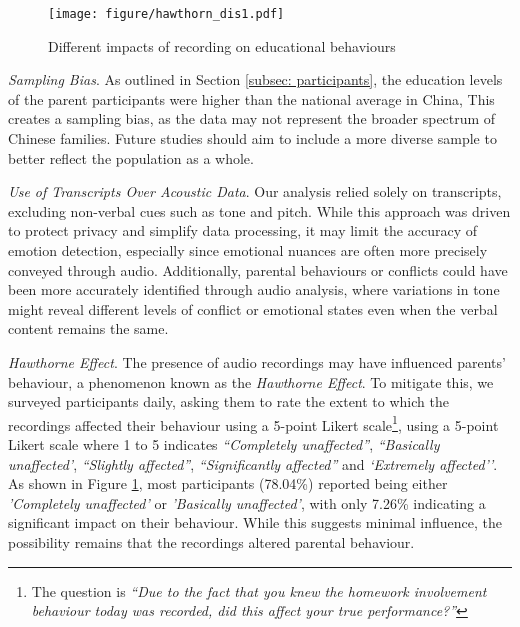\begin{figure}
    \centering
    \texttt{[image: figure/hawthorn\_dis1.pdf]}
    \caption{Different impacts of recording on educational behaviours}
    \label{fig:hawthorn}
\end{figure}


\textit{Sampling Bias}. As outlined in Section \ref{subsec: participants}, the education levels of the parent participants were higher than the national average in China, 
This creates a sampling bias, as the data may not represent the broader spectrum of Chinese families. Future studies should aim to include a more diverse sample to better reflect the population as a whole.

\textit{Use of Transcripts Over Acoustic Data}. Our analysis relied solely on transcripts, excluding non-verbal cues such as tone and pitch. While this approach was driven to protect privacy and simplify data processing, it may limit the accuracy of emotion detection, especially since emotional nuances are often more precisely conveyed through audio. Additionally, parental behaviours or conflicts could have been more accurately identified through audio analysis, where variations in tone might reveal different levels of conflict or emotional states even when the verbal content remains the same.





\textit{Hawthorne Effect}. The presence of audio recordings may have influenced parents' behaviour, a phenomenon known as the \textit{Hawthorne Effect}. To mitigate this, we surveyed participants daily, asking them to rate the extent to which the recordings affected their behaviour using a 5-point Likert scale\footnote{The question is \textit{``Due to the fact that you knew the homework involvement behaviour today was recorded, did this affect your true performance?''}}, using a 5-point Likert scale where 1 to 5 indicates \textit{``Completely unaffected''}, \textit{``Basically unaffected'}, \textit{``Slightly affected''}, \textit{``Significantly affected''} and \textit{`Extremely affected''}. As shown in Figure \ref{fig:hawthorn}, most participants (78.04\%) reported being either \textit{'Completely unaffected'} or \textit{'Basically unaffected'}, with only 7.26\% indicating a significant impact on their behaviour. While this suggests minimal influence, the possibility remains that the recordings altered parental behaviour.

